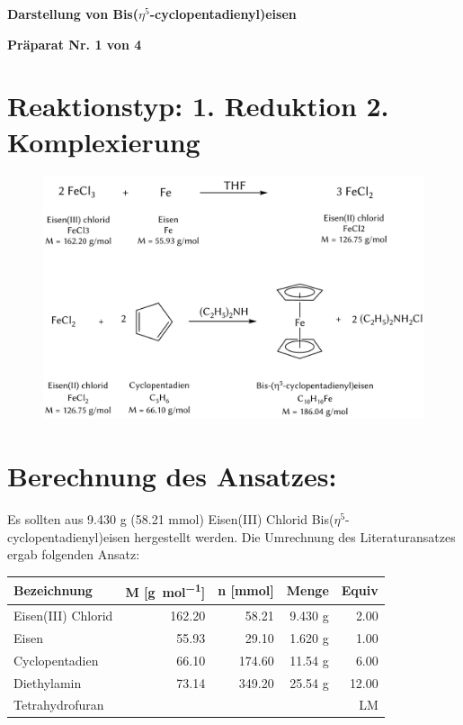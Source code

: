\documentclass[12pt]{article}
\begin{document}
\begin{onehalfspace}
  {\hfil  \textbf{\large Darstellung von Bis($\eta^5$-cyclopentadienyl)eisen}\hfil}
\par
  \vspace{1cm}
\hfil \textbf{Präparat Nr. 1 von 4 }\hfil
\section{Reaktionstyp: \textnormal{1. Reduktion 2. Komplexierung}  }
\begin{figure}[!ht]
   \centering
\includegraphics[width=\textwidth]{reaktion.png}
\end{figure}

\section{Berechnung des Ansatzes: }
Es sollten aus 9.430 g (58.21 \si{\milli\mol}) Eisen(III) Chlorid Bis($\eta^5$-cyclopentadienyl)eisen hergestellt werden.
Die Umrechnung des Literaturansatzes\cite{bio} ergab folgenden Ansatz:\\
\begin{tabularx}{\textwidth}{lrrrr}
\toprule
\textbf{Bezeichnung} &\textbf{ M [\si{\gram\per\mol}]} & \textbf{n [\si{\milli\mol}]} & \textbf{Menge} & \textbf{Equiv}\\
\midrule
Eisen(III) Chlorid     & 162.20  & 58.21  & 9.430 g  &  2.00  \\
Eisen        & 55.93   & 29.10  & 1.620 g  &  1.00 \\
Cyclopentadien      & 66.10   & 174.60  & 11.54 \si{\gram} &  6.00 \\
Diethylamin & 73.14   & 349.20  & 25.54 \si{\gram} &  12.00\\
Tetrahydrofuran  &   &  &  &  LM\\
\bottomrule
\end{tabularx}\\


\end{onehalfspace}
\end{document}
